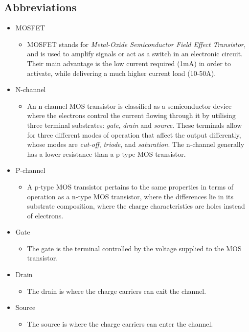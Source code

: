 \documentclass[12pt]{article}
\begin{document}
\subsection{Abbreviations}
\begin{itemize}
\item MOSFET
\begin{itemize}
\item MOSFET stands for \emph{Metal-Oxide Semiconductor Field Effect Transistor}, and is used to amplify signals or act as a switch in an electronic circuit. Their main advantage is the low current required (1mA) in order to activate, while delivering a much higher current load (10-50A).
\end{itemize}
\item N-channel
\begin{itemize}
\item An n-channel MOS transistor is classified as a semiconductor device where the electrons control the current flowing through it by utilising three terminal substrates: \emph{gate}, \emph{drain} and \emph{source}. These terminals allow for three different modes of operation that affect the output differently, whose modes are \emph{cut-off}, \emph{triode}, and \emph{saturation}. The n-channel generally has a lower resistance than a p-type MOS transistor. 
\end{itemize}
\item P-channel
\begin{itemize}
\item A p-type MOS transistor pertains to the same properties in terms of operation as a n-type MOS transistor, where the differences lie in its substrate composition, where the charge characteristics are holes instead of electrons.
\end{itemize}
\item Gate
\begin{itemize}
\item The gate is the terminal controlled by the voltage supplied to the MOS transistor.
\end{itemize}
\item Drain
\begin{itemize}
\item The drain is where the charge carriers can exit the channel.
\end{itemize}
\item Source
\begin{itemize}
\item The source is where the charge carriers can enter the channel.

\end{itemize}
\end{itemize}
\end{document}
